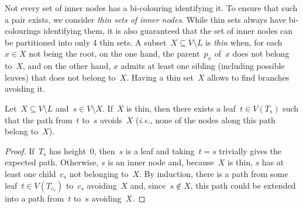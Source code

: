 \documentclass{lmcs} %
\def\ie{{\em i.e.}}
\begin{document}
Not every set of inner nodes
has a bi-colouring identifying it.
To ensure that such a pair exists,
we consider \emph{thin sets of inner nodes}. While thin sets always have bi-colourings identifying them, it is also guaranteed that the set of inner nodes can be partitioned into only 4 thin sets.
A subset~$X\subseteq V\setminus L$ is \emph{thin}
when, for each~$x\in X$ not being the root,
on the one hand, the parent~$p_x$ of~$x$ does not belong to~$X$,
and on the other hand, $x$ admits at least one sibling (including possible leaves) that does not belong to~$X$.
Having a thin set~$X$ allows to find branches avoiding it.
\begin{lem}
    \label{lem:thin => path avoiding}
    Let~$X\subseteq V\setminus L$ and~$s\in V\setminus X$.
    If~$X$ is thin, then there exists a leaf~$t\in V(T_s)$
    such that the path from~$t$ to~$s$ avoids~$X$
    (\ie, none of the nodes along this path belong to~$X$).
\end{lem}
\begin{proof}
    If~$T_s$ has height~$0$,
    then~$s$ is a leaf
    and taking~$t=s$ trivially gives the expected path.
    Otherwise,
    $s$ is an inner node and,
    because~$X$ is thin,
    $s$ has at least one child~$c_s$ not belonging to~$X$.
    By induction, there is a path from some leaf~$t\in V(T_{c_s})$ to~$c_s$ avoiding~$X$ and,
    since~$s\notin X$,
    this path could be extended into a path from~$t$ to~$s$ avoiding~$X$.
\end{proof}
\end{document}
